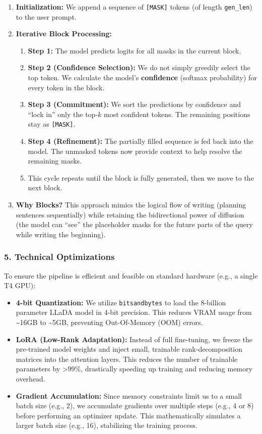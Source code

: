 \documentclass[a4paper,12pt]{article}
\begin{document}
\begin{enumerate}
    \item \textbf{Initialization:} We append a sequence of \texttt{[MASK]} tokens (of length \texttt{gen\_len}) to the user prompt.
    \item \textbf{Iterative Block Processing:}
    \begin{enumerate}
        \item \textbf{Step 1:} The model predicts logits for all masks in the current block.
        \item \textbf{Step 2 (Confidence Selection):} We do not simply greedily select the top token. We calculate the model's \textbf{confidence} (softmax probability) for every token in the block.
        \item \textbf{Step 3 (Commitment):} We sort the predictions by confidence and ``lock in'' only the top-$k$ most confident tokens. The remaining positions stay as \texttt{[MASK]}.
        \item \textbf{Step 4 (Refinement):} The partially filled sequence is fed back into the model. The unmasked tokens now provide context to help resolve the remaining masks.
        \item This cycle repeats until the block is fully generated, then we move to the next block.
    \end{enumerate}
    \item \textbf{Why Blocks?} This approach mimics the logical flow of writing (planning sentences sequentially) while retaining the bidirectional power of diffusion (the model can ``see'' the placeholder masks for the future parts of the query while writing the beginning).
\end{enumerate}

\subsubsection{5. Technical Optimizations}

To ensure the pipeline is efficient and feasible on standard hardware (e.g., a single T4 GPU):

\begin{itemize}
    \item \textbf{4-bit Quantization:} We utilize \texttt{bitsandbytes} to load the 8-billion parameter LLaDA model in 4-bit precision. This reduces VRAM usage from \textasciitilde16GB to \textasciitilde5GB, preventing Out-Of-Memory (OOM) errors.
    \item \textbf{LoRA (Low-Rank Adaptation):} Instead of full fine-tuning, we freeze the pre-trained model weights and inject small, trainable rank-decomposition matrices into the attention layers. This reduces the number of trainable parameters by >99\%, drastically speeding up training and reducing memory overhead.
    \item \textbf{Gradient Accumulation:} Since memory constraints limit us to a small batch size (e.g., 2), we accumulate gradients over multiple steps (e.g., 4 or 8) before performing an optimizer update. This mathematically simulates a larger batch size (e.g., 16), stabilizing the training process.
\end{itemize}
\end{document}
